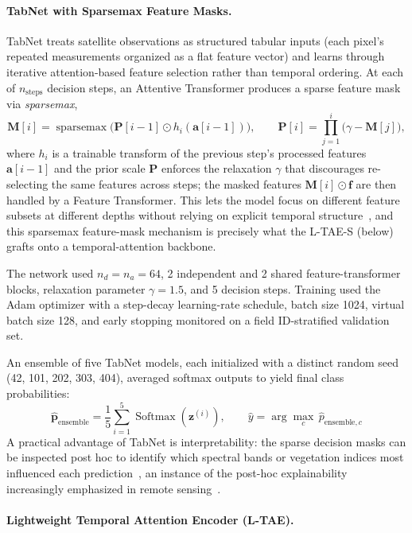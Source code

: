 \documentclass[pdflatex,sn-mathphys]{sn-jnl} %
\begin{document}
\paragraph{TabNet with Sparsemax Feature Masks.}

TabNet treats satellite observations as structured tabular inputs (each pixel's
repeated measurements organized as a flat feature vector) and learns through
iterative attention-based feature selection rather than temporal ordering. At each
of $n_{\text{steps}}$ decision steps, an Attentive Transformer produces a sparse feature
mask via \emph{sparsemax},
\[
  \mathbf{M}[i]=\operatorname{sparsemax}\!\big(\mathbf{P}[i-1]\odot h_i(\mathbf{a}[i-1])\big),
  \qquad
  \mathbf{P}[i]=\prod_{j=1}^{i}\big(\gamma-\mathbf{M}[j]\big),
\]
where $h_i$ is a trainable transform of the previous step's processed features
$\mathbf{a}[i-1]$ and the prior scale $\mathbf{P}$ enforces the relaxation $\gamma$ that
discourages re-selecting the same features across steps; the masked features
$\mathbf{M}[i]\odot\mathbf{f}$ are then handled by a Feature Transformer. This lets the
model focus on different feature subsets at different depths without relying on explicit
temporal structure~\cite{tabnet_orig, tabnet2024}, and this sparsemax feature-mask
mechanism is precisely what the L-TAE-S (below) grafts onto a temporal-attention backbone.

The network used $n_d = n_a = 64$, 2 independent and 2 shared feature-transformer blocks,
relaxation parameter $\gamma = 1.5$, and 5 decision steps. Training used the
Adam optimizer with a step-decay learning-rate schedule, batch size 1024, virtual batch size
128, and early stopping monitored on a field ID-stratified validation set.

An ensemble of five TabNet models, each initialized with a distinct random seed
(42, 101, 202, 303, 404), averaged softmax outputs to yield final class
probabilities:
\[
    \hat{\mathbf{p}}_{\text{ensemble}}
    = \frac{1}{5}\sum_{i=1}^{5}\operatorname{Softmax}\!\left(\mathbf{z}^{(i)}\right),
    \qquad
    \hat{y} = \arg\max_c\,\hat{p}_{\text{ensemble},c}
\]
A practical advantage of TabNet is interpretability: the sparse decision masks
can be inspected post hoc to identify which spectral bands or vegetation indices
most influenced each prediction~\cite{tabnet2024}, an instance of the post-hoc explainability increasingly emphasized in remote sensing~\cite{hohl2024}.

\paragraph{Lightweight Temporal Attention Encoder (L-TAE).}
\end{document}
